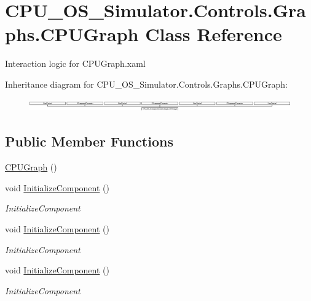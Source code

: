 \hypertarget{class_c_p_u___o_s___simulator_1_1_controls_1_1_graphs_1_1_c_p_u_graph}{}\section{C\+P\+U\+\_\+\+O\+S\+\_\+\+Simulator.\+Controls.\+Graphs.\+C\+P\+U\+Graph Class Reference}
\label{class_c_p_u___o_s___simulator_1_1_controls_1_1_graphs_1_1_c_p_u_graph}


Interaction logic for C\+P\+U\+Graph.\+xaml  


Inheritance diagram for C\+P\+U\+\_\+\+O\+S\+\_\+\+Simulator.\+Controls.\+Graphs.\+C\+P\+U\+Graph\+:\begin{figure}[H]
\begin{center}
\leavevmode
\includegraphics[height=0.553633cm]{class_c_p_u___o_s___simulator_1_1_controls_1_1_graphs_1_1_c_p_u_graph}
\end{center}
\end{figure}
\subsection*{Public Member Functions}
\begin{DoxyCompactItemize}
\item 
\hyperlink{class_c_p_u___o_s___simulator_1_1_controls_1_1_graphs_1_1_c_p_u_graph_a625aff911242a4f4328714c0f42e9c99}{C\+P\+U\+Graph} ()
\item 
void \hyperlink{class_c_p_u___o_s___simulator_1_1_controls_1_1_graphs_1_1_c_p_u_graph_af9fdc415d177c3c5e7636113817a0922}{Initialize\+Component} ()
\begin{DoxyCompactList}\small\item\em Initialize\+Component \end{DoxyCompactList}\item 
void \hyperlink{class_c_p_u___o_s___simulator_1_1_controls_1_1_graphs_1_1_c_p_u_graph_af9fdc415d177c3c5e7636113817a0922}{Initialize\+Component} ()
\begin{DoxyCompactList}\small\item\em Initialize\+Component \end{DoxyCompactList}\item 
void \hyperlink{class_c_p_u___o_s___simulator_1_1_controls_1_1_graphs_1_1_c_p_u_graph_af9fdc415d177c3c5e7636113817a0922}{Initialize\+Component} ()
\begin{DoxyCompactList}\small\item\em Initialize\+Component \end{DoxyCompactList}\end{DoxyCompactItemize}
